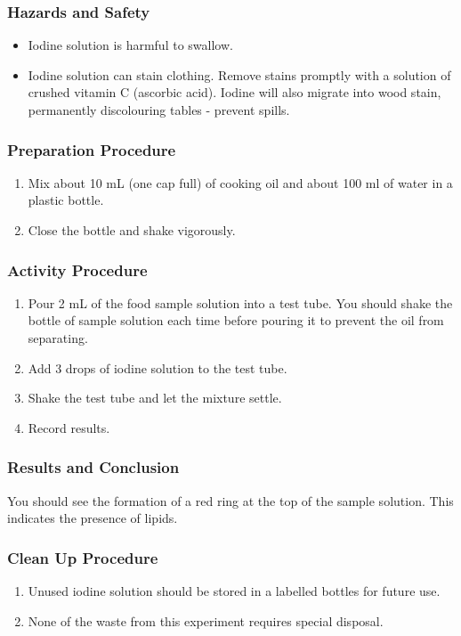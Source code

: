 \subsubsection*{Hazards and Safety}
\begin{itemize}
\item{Iodine solution is harmful to swallow.}
\item{Iodine solution can stain clothing. Remove stains promptly with a solution of crushed vitamin C (ascorbic acid). Iodine will also migrate into wood stain, permanently discolouring tables - prevent spills.}
\end{itemize}

\subsubsection*{Preparation Procedure}
\begin{enumerate}
\item{Mix about 10 mL (one cap full) of cooking oil and about 100 ml of water in a plastic bottle.}
\item{Close the bottle and shake vigorously.}
\end{enumerate}

\subsubsection*{Activity Procedure}
\begin{enumerate}
\item{Pour 2 mL of the food sample solution into a test tube. You should shake the bottle of sample solution each time before pouring it to prevent the oil from separating.}
\item{Add 3 drops of iodine solution to the test tube.}
\item{Shake the test tube and let the mixture settle.}
\item{Record results.}
\end{enumerate}

\subsubsection*{Results and Conclusion}
You should see the formation of a red ring at the top of the sample solution. This indicates the presence of lipids.

\subsubsection*{Clean Up Procedure}
\begin{enumerate}
\item{Unused iodine solution should be stored in a labelled bottles for future use.}
\item{None of the waste from this experiment requires special disposal.}
\end{enumerate}

